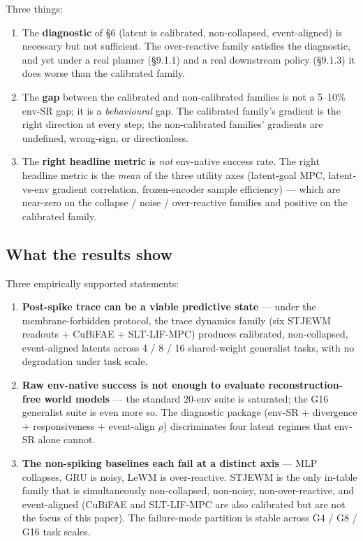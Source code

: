 \documentclass{article}
\begin{document}
Three things:

\begin{enumerate}
\item The \textbf{diagnostic} of §6 (latent is calibrated, non-collapsed,
event-aligned) is necessary but not sufficient. The over-reactive
family satisfies the diagnostic, and yet under a real planner
(§9.1.1) and a real downstream policy (§9.1.3) it does worse than
the calibrated family.

\item The \textbf{gap} between the calibrated and non-calibrated families is
not a 5--10\% env-SR gap; it is a \emph{behavioural} gap. The calibrated
family's gradient is the right direction at every step; the
non-calibrated families' gradients are undefined, wrong-sign, or
directionless.

\item The \textbf{right headline metric} is \emph{not} env-native success rate. The
right headline metric is the \emph{mean} of the three utility axes
(latent-goal MPC, latent-vs-env gradient correlation, frozen-encoder
sample efficiency) --- which are near-zero on the collapse / noise /
over-reactive families and positive on the calibrated family.
\end{enumerate}

\subsection{What the results show}

Three empirically supported statements:

\begin{enumerate}
\item \textbf{Post-spike trace can be a viable predictive state} --- under the
membrane-forbidden protocol, the trace dynamics family (six STJEWM
readouts + CuBiFAE + SLT-LIF-MPC) produces calibrated, non-collapsed,
event-aligned latents across 4 / 8 / 16 shared-weight generalist
tasks, with no degradation under task scale.

\item \textbf{Raw env-native success is not enough to evaluate
reconstruction-free world models} --- the standard 20-env suite is
saturated; the G16 generalist suite is even more so. The diagnostic
package (env-SR + divergence + responsiveness + event-align $\rho$)
discriminates four latent regimes that env-SR alone cannot.

\item \textbf{The non-spiking baselines each fail at a distinct axis} --- MLP
collapses, GRU is noisy, LeWM is over-reactive. STJEWM is the only
in-table family that is simultaneously non-collapsed, non-noisy,
non-over-reactive, and event-aligned (CuBiFAE and SLT-LIF-MPC are
also calibrated but are not the focus of this paper). The
failure-mode partition is stable across G4 / G8 / G16 task scales.
\end{enumerate}
\end{document}
